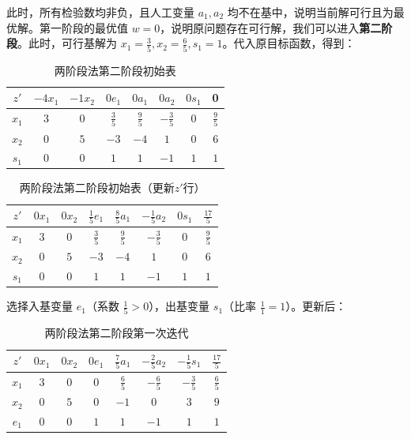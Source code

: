 \documentclass[12pt]{article}
\theoremstyle{plain}
\theoremstyle{definition}
\begin{document}
此时，所有检验数均非负，且人工变量 $a_1, a_2$ 均不在基中，说明当前解可行且为最优解。第一阶段的最优值 $w = 0$，说明原问题存在可行解，我们可以进入\textbf{第二阶段}。此时，可行基解为 $x_1 = \frac{3}{5}, x_2 = \frac{6}{5}, s_1 = 1$。代入原目标函数，得到：
\begin{table}[!htbp]
    \centering
    \caption{两阶段法第二阶段初始表}
    \begin{tabular}{c|cccccc|c}
        \hline
        $z'$ & $-4x_1$ & $-1x_2$ & $0e_1$ & $0a_1$ & $0a_2$ & $0s_1$ & 0 \\
        \hline
        $x_1$ & $3$ & $0$ & $\frac{3}{5}$ & $\frac{9}{5}$ & $-\frac{3}{5}$ & $0$ & $\frac{9}{5}$ \\
        $x_2$ & $0$ & $5$ & $-3$ & $-4$ & $1$ & $0$ & $6$ \\
        $s_1$ & $0$ & $0$ & $1$ & $1$ & $-1$ & $1$ & $1$ \\
        \hline
    \end{tabular}    
\end{table}
\begin{table}[!htbp]
    \centering
    \caption{两阶段法第二阶段初始表（更新$z'$行）}
    \begin{tabular}{c|cccccc|c}
        \hline
        $z'$ & $0x_1$ & $0x_2$ & $\frac{1}{5}e_1$ & $\frac{8}{5}a_1$ & $-\frac{1}{5}a_2$ & $0s_1$ & $\frac{17}{5}$ \\
        \hline
        $x_1$ & $3$ & $0$ & $\frac{3}{5}$ & $\frac{9}{5}$ & $-\frac{3}{5}$ & $0$ & $\frac{9}{5}$ \\
        $x_2$ & $0$ & $5$ & $-3$ & $-4$ & $1$ & $0$ & $6$ \\
        $s_1$ & $0$ & $0$ & $1$ & $1$ & $-1$ & $1$ & $1$ \\
        \hline
    \end{tabular}    
\end{table}

选择入基变量 $e_1$（系数 $\frac{1}{5} > 0$），出基变量 $s_1$（比率 $\frac{1}{1} = 1$）。更新后：
\begin{table}[!htbp]
    \centering
    \caption{两阶段法第二阶段第一次迭代}
    \begin{tabular}{c|cccccc|c}
        \hline
        $z'$ & $0x_1$ & $0x_2$ & $0e_1$ & $\frac{7}{5}a_1$ & $-\frac{2}{5}a_2$ & $-\frac{1}{5}s_1$ & $\frac{17}{5}$ \\
        \hline
        $x_1$ & $3$ & $0$ & $0$ & $\frac{6}{5}$ & $-\frac{6}{5}$ & $-\frac{3}{5}$ & $\frac{6}{5}$ \\
        $x_2$ & $0$ & $5$ & $0$ & $-1$ & $0$ & $3$ & $9$ \\
        $e_1$ & $0$ & $0$ & $1$ & $1$ & $-1$ & $1$ & $1$ \\
        \hline
    \end{tabular}
\end{table}
\end{document}
